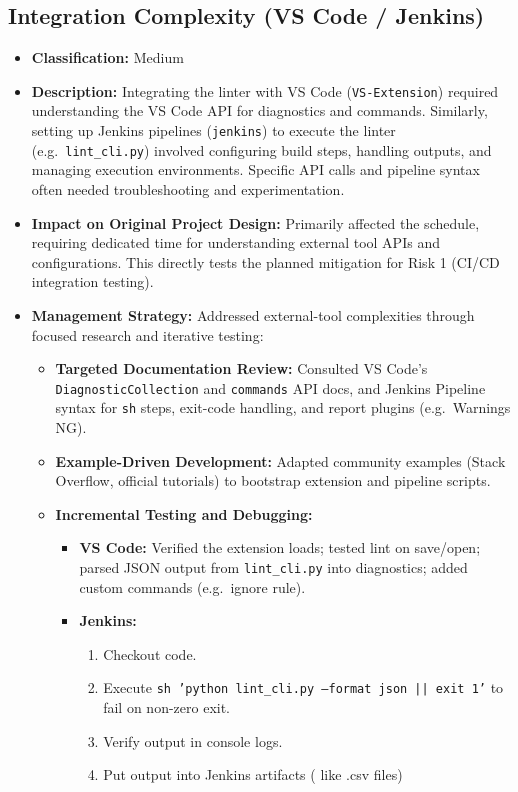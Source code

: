 \subsection{Integration Complexity (VS Code / Jenkins)}
\label{subsec:integration_difficulty}
\begin{itemize}
  \item \textbf{Classification:} Medium
  \item \textbf{Description:} Integrating the linter with VS Code (\texttt{VS-Extension}) required understanding the VS Code API for diagnostics and commands. Similarly, setting up Jenkins pipelines (\texttt{jenkins}) to execute the linter (e.g.\ \texttt{lint\_cli.py}) involved configuring build steps, handling outputs, and managing execution environments. Specific API calls and pipeline syntax often needed troubleshooting and experimentation.
  \item \textbf{Impact on Original Project Design:} Primarily affected the schedule, requiring dedicated time for understanding external tool APIs and configurations. This directly tests the planned mitigation for Risk 1 (CI/CD integration testing).
  \item \textbf{Management Strategy:} Addressed external-tool complexities through focused research and iterative testing:
    \begin{itemize}
      \item \textbf{Targeted Documentation Review:} Consulted VS Code’s \texttt{DiagnosticCollection} and \texttt{commands} API docs, and Jenkins Pipeline syntax for \texttt{sh} steps, exit-code handling, and report plugins (e.g.\ Warnings NG).
      \item \textbf{Example-Driven Development:} Adapted community examples (Stack Overflow, official tutorials) to bootstrap extension and pipeline scripts.
      \item \textbf{Incremental Testing and Debugging:}
        \begin{itemize}
          \item \textbf{VS Code:} Verified the extension loads; tested lint on save/open; parsed JSON output from \texttt{lint\_cli.py} into diagnostics; added custom commands (e.g.\ ignore rule).
          \item \textbf{Jenkins:} 
            \begin{enumerate}
              \item Checkout code.
              \item Execute \texttt{sh 'python lint\_cli.py --format json || exit 1'} to fail on non-zero exit.
              \item Verify output in console logs.
              \item Put output into Jenkins artifacts ( like .csv files)
            \end{enumerate}
        \end{itemize}
    \end{itemize}
\end{itemize}
